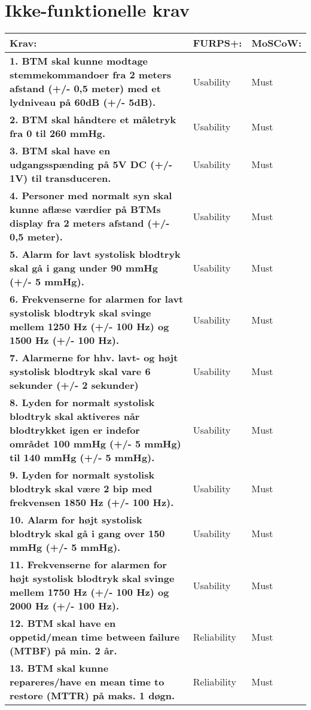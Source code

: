 \chapter{Ikke-funktionelle krav}
\begin{table} [htbp]
\centering
\begin{tabular}{|p{10cm}|l|l|}
\hline
\textbf{Krav:} & \textbf{FURPS+:} & \textbf{MoSCoW:} \\ \hline
\textbf{1. BTM skal kunne modtage stemmekommandoer fra 2 meters afstand (+/- 0,5 meter) med et lydniveau på 60dB (+/- 5dB).} & Usability & Must \\ \hline
\textbf{2. BTM skal håndtere et måletryk fra 0 til 260 mmHg. }  & Usability & Must \\ \hline 
\textbf{3. BTM skal have en udgangsspænding på 5V DC (+/- 1V) til transduceren.} & Usability & Must \\ \hline
\textbf{4. Personer med normalt syn skal kunne aflæse værdier på BTMs display fra 2 meters afstand (+/- 0,5 meter). } & Usability & Must \\ \hline
\textbf{5. Alarm for lavt systolisk blodtryk skal gå i gang under 90 mmHg (+/- 5 mmHg).} & Usability & Must \\ \hline
\textbf{6. Frekvenserne for alarmen for lavt systolisk blodtryk skal svinge mellem 1250 Hz (+/- 100 Hz) og 1500 Hz (+/- 100 Hz).} & Usability & Must \\ \hline
\textbf{7. Alarmerne for hhv. lavt- og højt systolisk blodtryk skal vare 6 sekunder (+/- 2 sekunder)} & Usability & Must \\ \hline
\textbf{8. Lyden for normalt systolisk blodtryk skal aktiveres når blodtrykket igen er indefor området 100 mmHg (+/- 5 mmHg) til 140 mmHg (+/- 5 mmHg).} & Usability & Must \\ \hline
\textbf{9. Lyden for normalt systolisk blodtryk skal være 2 bip med frekvensen 1850 Hz (+/- 100 Hz).} & Usability & Must \\ \hline
\textbf{10. Alarm for højt systolisk blodtryk skal gå i gang over 150 mmHg (+/- 5 mmHg).} & Usability & Must \\ \hline
\textbf{11. Frekvenserne for alarmen for højt systolisk blodtryk skal svinge mellem 1750 Hz (+/- 100 Hz) og 2000 Hz (+/- 100 Hz).} & Usability & Must \\ \hline
\textbf{12. BTM skal have en oppetid/mean time between failure (MTBF) på min. 2 år. } & Reliability & Must \\ \hline
\textbf{13. BTM skal kunne repareres/have en mean time to restore (MTTR) på maks. 1 døgn. } & Reliability & Must \\ \hline

\end{tabular}
\end{table}
